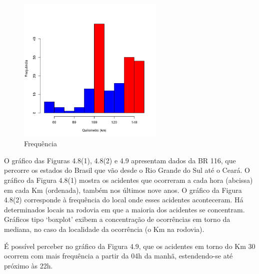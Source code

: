 \quad \quad
\begin{figure}[h]
	\centering
	\caption{ Frequência}
	\includegraphics[width=7cm,height=7cm]{Figuras/Preprocess/br110_3.png}
\end{figure}


\pagebreak

O gráfico das Figuras 4.8(1), 4.8(2)  e 4.9 apresentam dados da BR 116, que percorre os estados do Brasil que vão desde o Rio Grande do Sul até o Ceará. O gráfico da Figura 4.8(1) mostra os acidentes que ocorreram a cada hora (abcissa) em cada Km (ordenada), também nos últimos nove anos. 
O  gráfico da Figura 4.8(2) corresponde à frequência do local onde esses acidentes aconteceram. Há determinados locais na rodovia em que a maioria dos acidentes se concentram. 
Gráficos tipo ‘boxplot’ exibem a concentração de ocorrências em torno da mediana, no caso da localidade da ocorrência (o Km na rodovia). 
 
É possível perceber no gráfico da Figura 4.9, que os acidentes em torno do Km 30 ocorrem com mais frequência a partir da 04h da manhã, estendendo-se até próximo às 22h. 


